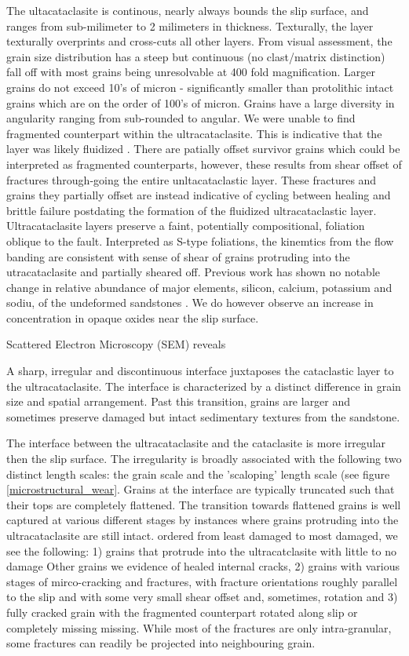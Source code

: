 \documentclass[12pt,a4paper]{article}
\begin{document}
	The ultacataclasite is continous, nearly always bounds the slip surface, and ranges from sub-milimeter to 2 milimeters in thickness. Texturally, the layer texturally overprints and cross-cuts all other layers. From visual assessment, the grain size distribution has a steep but continuous (no clast/matrix distinction) fall off with most grains being unresolvable at 400 fold magnification. Larger grains do not exceed 10's of micron - significantly smaller than protolithic intact grains which are on the order of 100's of micron. Grains have a large diversity in angularity ranging from sub-rounded to angular. We were unable to find fragmented counterpart within the ultracataclasite. This is indicative that the layer was likely fluidized \cite{otsuki2003fluidization}. There are patially offset survivor grains which could be interpreted as fragmented counterparts, however, these results from shear offset of fractures through-going the entire unltacataclastic layer. These fractures and grains they partially offset are instead indicative of cycling between healing and brittle failure postdating the formation of the fluidized ultracataclastic layer. Ultracataclasite layers preserve a faint, potentially compositional, foliation oblique to the fault. Interpreted as S-type foliations, the kinemtics from the flow banding are consistent with sense of shear of grains protruding into the utracataclasite and partially sheared off. Previous work has shown no notable change in relative abundance of major elements, silicon, calcium, potassium and sodiu, of the undeformed sandstones  \cite{aydin1977faulting}. We do however observe an increase in concentration in opaque oxides near the slip surface.	

	
	Scattered Electron Microscopy (SEM) reveals 

	A sharp, irregular and discontinuous interface juxtaposes the cataclastic layer to the ultracataclasite. The interface is characterized by a distinct difference in grain size and spatial arrangement. Past this transition, grains are larger and sometimes preserve damaged but intact sedimentary textures from the sandstone.

	The interface between the ultracataclasite and the cataclasite is more irregular then the slip surface. The irregularity is broadly associated with the following two distinct length scales: the grain scale and the 'scaloping' length scale (see figure \ref{microstructural_wear}. Grains at the interface are typically truncated such that their tops are completely flattened. The transition towards flattened grains is well captured at various different stages by instances where grains protruding into the ultracataclasite are still intact. ordered from least damaged to most damaged, we see the following: 1) grains that protrude into the ultracatclasite with little to no damage Other grains we evidence of healed internal cracks, 2) grains with various stages of mirco-cracking and fractures, with fracture orientations roughly parallel to the slip  and with some very small shear offset and, sometimes, rotation and 3) fully cracked grain with the fragmented counterpart rotated along slip or completely missing missing. While most of the fractures are only intra-granular, some fractures can readily be projected into neighbouring grain. 
	
\end{document}
